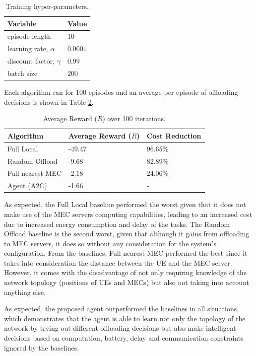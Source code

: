 \begin{table}[H]
\centering
\begin{tabular}{|l|l|}
\hline
Variable & Value \\ \hline
episode length&$10$\\
learning rate, $\alpha$&$0.0001$\\
discount factor, $\gamma$&$0.99$\\
batch size&$200$\\ \hline
\end{tabular}
\caption{Training hyper-parameters.}\label{training_hyperparams}
\end{table}

Each algorithm ran for 100 episodes and an average per episode of offloading decisions is shown in Table \ref{resultstest1}.

\begin{table}[H]
\centering
\begin{tabular}{|l|l|l|}
\hline
Algorithm        & Average Reward ($R$) & Cost Reduction\\ \hline
Full Local       & -49.47 & 96.65\%\\
Random Offload   & -9.68 & 82.89\%\\
Full nearest MEC & -2.18 & 24.06\%\\ 
Agent (A2C) & -1.66 & -\\ \hline
\end{tabular}
\caption{Average Reward ($R$) over 100 iterations.} \label{resultstest1}
\end{table}

As expected, the Full Local baseline performed the worst given that it does not make use of the \acrshort{MEC} servers computing capabilities, leading to an increased cost due to increased energy consumption and delay of the tasks. The Random Offload baseline is the second worst, given that although it gains from offloading to \acrshort{MEC} servers, it does so without any consideration for the system's configuration. From the baselines, Full nearest MEC performed the best since it takes into consideration the distance between the \acrshort{UE} and the \acrshort{MEC} server. However, it comes with the disadvantage of not only requiring knowledge of the network topology (positions of \acrshort{UE}s and \acrshort{MEC}s) but also not taking into account anything else. 

As expected, the proposed agent outperformed the baselines in all situations, which demonstrates that the agent is able to learn not only the topology of the network by trying out different offloading decisions but also make intelligent decisions based on computation, battery, delay and communication constraints ignored by the baselines.

